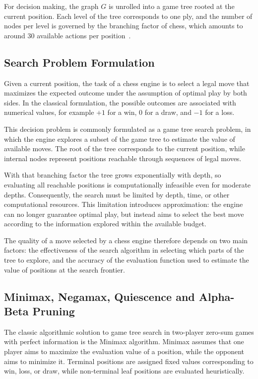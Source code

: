 For decision making, the graph $G$ is unrolled into a game tree rooted at the
current position. Each level of the tree corresponds to one ply, and the number of
nodes per level is governed by the branching factor of chess, which amounts to
around $30$ available actions per position~\cite{yannakakis2018artificial}.

\subsection{Search Problem Formulation}

Given a current position, the task of a chess engine is to select a legal move
that maximizes the expected outcome under the assumption of optimal play by both
sides. In the classical formulation, the possible outcomes are associated with
numerical values, for example $+1$ for a win, $0$ for a draw, and $-1$ for a
loss.

This decision problem is commonly formulated as a game tree search problem, in
which the engine explores a subset of the game tree to estimate the value of
available moves. The root of the tree corresponds to the current position, while
internal nodes represent positions reachable through sequences of legal moves.

With that branching factor the tree grows exponentially with depth, so evaluating
all reachable positions is computationally infeasible even for moderate depths.
Consequently, the search must be limited by depth,
time, or other computational resources. This limitation introduces approximation:
the engine can no longer guarantee optimal play, but instead aims to select the
best move according to the information explored within the available budget.

The quality of a move selected by a chess engine therefore depends on two main
factors: the effectiveness of the search algorithm in selecting which parts of
the tree to explore, and the accuracy of the evaluation function used to estimate
the value of positions at the search frontier.

\subsection{Minimax, Negamax, Quiescence and Alpha-Beta Pruning}
\label{subsec:minimax_alphabeta}

The classic algorithmic solution to game tree search in two-player zero-sum
games with perfect information is the Minimax algorithm. Minimax assumes that
one player aims to maximize the evaluation value of a position, while the
opponent aims to minimize it. Terminal positions are assigned fixed values
corresponding to win, loss, or draw, while non-terminal leaf positions are
evaluated heuristically.

